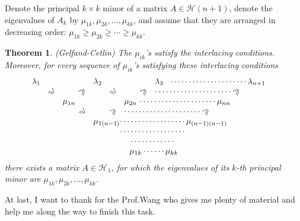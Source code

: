 \documentclass[11pt]{amsart}
\numberwithin{equation}{section}
\theoremstyle{plain}
\newtheorem{theorem}{Theorem}[section]
\theoremstyle{plain}
\numberwithin{equation}{section}
\theoremstyle{remark}
\begin{document}
Denote the principal $k \times k$ minor of a matrix $A \in \mathcal{H}(n+1)$, denote the eigenvalues of $A_k$ by $\mu_{1k},\mu_{2k},\ldots,\mu_{kk}$, and assume that they are arranged in decreasing order: $\mu_{1k}\geqslant \mu_{2k}\geqslant \cdots\geqslant\mu_{kk}$. 
\begin{theorem}(Gelfand-Cetlin)
The $\mu_{ik}$'s satisfy the interlacing conditions. Moreover, for every sequence of $\mu_{ik}$'s satisfying these interlacing conditions
\[
\begin{array}{p{3mm}p{3mm}p{3mm}p{3mm}p{3mm}p{3mm}p{3mm}p{3mm}p{3mm}p{45mm}}
$\lambda_1$&&&&$\lambda_2$&&&&$\lambda_3$&$\cdots\cdots\cdots\cdots\cdots\cdots\cdots\lambda_{n+1}$\\
&$\rotatebox[origin=c]{-45}{$\geqslant$}$&&$\rotatebox[origin=c]{45}{$\geqslant$}$&&$\rotatebox[origin=c]{-45}{$\geqslant$}$&&$\rotatebox[origin=c]{45}{$\geqslant$}$&$\cdots\cdots\cdots\cdots\cdots\cdots\cdots\rotatebox[origin=c]{45}{$\geqslant$}$&\\
&&$\mu_{1n}$&&&&$\mu_{2n}$&$\cdots\cdots\cdots\cdots\cdots\cdots\cdots\mu_{nn}$&&\\
&&&$\rotatebox[origin=c]{-45}{$\geqslant$}$&&$\rotatebox[origin=c]{45}{$\geqslant$}$&$\cdots\cdots\cdots\cdots\cdots\cdots\cdots\rotatebox[origin=c]{45}{$\geqslant$}$&&&\\
&&&& $\mu_{1(n-1)}$&$\phantom{\cdots}\cdots\cdots\cdots\cdots\cdots\cdots\mu_{(n-1)(n-1)}$&&&&\\
&&&&&$\phantom{\cdots}\cdots\cdots\cdots\cdots\cdots\cdots$\\
&&&&&$\phantom{\cdots\cdots}\cdots\cdots\cdots\cdots$\\
&&&&&$\phantom{\cdots\cdots}\mu_{1k}\cdots\cdots\mu_{kk}$
\end{array}
\]
there exists a matrix $A \in \mathcal{H}_\lambda$, for which the eigenvalues of its $k$-th principal minor are $\mu_{1k}, \mu_{2k},\ldots,\mu_{kk}$.
\end{theorem} 




At last, I want to thank for the Prof.Wang who gives me plenty of material and help me along the way to finish this task.

 
   



 
\end{document}
